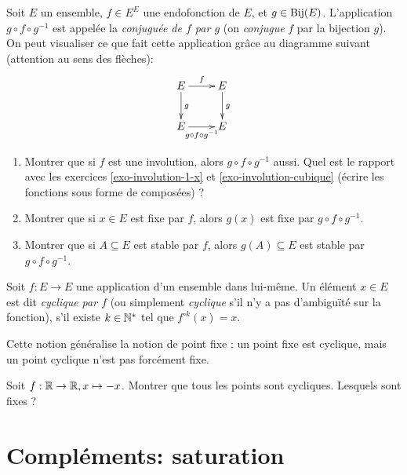\begin{exercice}
\label{exo-conjugaison}
Soit $E$ un ensemble, $f \in E^E$ une endofonction de $E$, et $g \in \operatorname{Bij}(E)$. L'application $g\circ f \circ g^{-1}$ est appelée la \emph{conjuguée de $f$ par $g$} (on \emph{conjugue} $f$ par la bijection $g$). On peut visualiser ce que fait cette application grâce au diagramme suivant (attention au sens des flèches):
\[\xymatrix{
E \ar[d]^g \ar[r]^f & E \ar[d]^g\\
E \ar[r]_{g\circ f\circ g^{-1}}& E
}\]
\begin{enumerate}
\item Montrer que si $f$ est une involution, alors $g\circ f \circ g^{-1}$ aussi. Quel est le rapport avec les exercices \ref{exo-involution-1-x} et \ref{exo-involution-cubique} (écrire les fonctions sous forme de composées) ?
\item Montrer que si $x\in E$ est fixe par $f$, alors $g(x)$ est fixe par $g\circ f \circ g^{-1}$.
\item Montrer que si $A \subseteq E$ est stable par $f$, alors $g(A) \subseteq E$ est stable par $g\circ f \circ g^{-1}$.
\end{enumerate}
\end{exercice}

\begin{definition}\label{def-point-cyclique}
Soit $f : E\to E$ une application d'un ensemble dans lui-même. Un élément $x\in E$ est dit \emph{cyclique par $f$} (ou simplement \emph{cyclique} s'il n'y a pas d'ambiguïté sur la fonction), s'il existe $k\in\mathbb{N}^*$ tel que $f^{\circ k}(x)=x$. 
\end{definition}

Cette notion généralise la notion de point fixe : un point fixe est cyclique, mais un point cyclique n'est pas forcément fixe.

\begin{exercice}
Soit $f : \mathbb{R}\to \mathbb{R}, x\mapsto -x$. Montrer que tous les points sont cycliques. Lesquels sont fixes ?
\end{exercice}



\section{Compléments: saturation}


